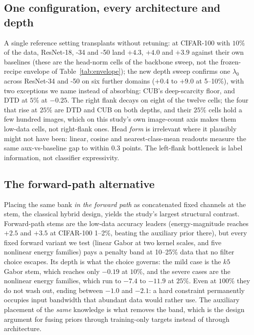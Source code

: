 \subsection{One configuration, every architecture and depth}\label{abl:universal}
A single reference setting transplants without retuning: at CIFAR-100 with
$10\%$ of the data, ResNet-18, -34 and -50 land $+4.3$, $+4.0$ and $+3.9$
against their own baselines (these are the head-norm cells of the backbone
sweep, not the frozen-recipe envelope of Table~\ref{tab:envelope}); the new
depth sweep confirms one $\lambda_0$ across ResNet-34 and -50 on six further
domains ($+0.4$ to $+9.0$ at 5--10\%), with two exceptions we name instead of absorbing: CUB's deep-scarcity floor, and DTD at $5\%$ at $-0.25$. The right flank
decays on eight of the twelve cells; the four that rise at $25\%$ are DTD and
CUB on both depths, and their $25\%$ cells hold a few hundred images, which on
this study's own image-count axis makes them low-data cells, not
right-flank ones. Head \emph{form} is
irrelevant where it plausibly might not have been: linear, cosine and
nearest-class-mean readouts measure the same aux-vs-baseline gap to within
$0.3$ points. The left-flank bottleneck is label information, not classifier
expressivity.

\subsection{The forward-path alternative}\label{abl:forward}
Placing the same bank \emph{in the forward path} as concatenated fixed channels
at the stem, the classical hybrid design, yields the study's largest structural
contrast. Forward-path stems are the low-data accuracy leaders
(energy-magnitude reaches $+2.5$ and $+3.5$ at CIFAR-100 1--2\%, beating the
auxiliary prior there), but every fixed forward variant we test (linear Gabor
at two kernel scales, and five nonlinear energy families) pays a penalty band
at 10--25\% data that no filter choice escapes. Its depth is what the choice
governs: the mild case is the $k5$ Gabor stem, which reaches only $-0.19$ at
$10\%$, and the severe cases are the nonlinear energy families, which run to
$-7.4$ to $-11.9$ at $25\%$. Even at $100\%$ they do not
wash out, ending between $-1.0$ and $-2.1$: a hard constraint permanently
occupies input bandwidth that abundant data would rather use. The auxiliary placement of the \emph{same} knowledge is what removes the
band, which is the design argument for fusing priors through training-only
targets instead of through architecture.

